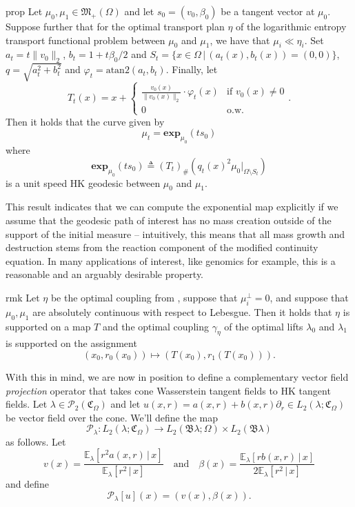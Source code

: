 \documentclass[11pt]{article}
\begin{document}
\begin{restatable}{prop}{} \label{HK exponential map closed form}
    Let $\mu_0, \mu_1 \in \mathfrak{M}_+(\Omega)$ and let $s_0 = (v_0, \beta_0)$ be a tangent vector at $\mu_0$. Suppose further that for the optimal transport plan $\eta$ of the logarithmic entropy transport functional problem between $\mu_0$ and $\mu_1$, we have that $\mu_i \ll \eta_i$. Set $a_t = t\|v_0\|_2$, $b_t = 1 + t\beta_0/2$ and $S_t = \{x \in \Omega \, | \, (a_t(x), b_t(x)) = (0, 0) \}$, $q = \sqrt{a_t^2 + b_t^2}$ and $\varphi_t = \text{atan2}(a_t, b_t).$ Finally, let 
    \[T_t ( x) = x + \begin{cases}
        \frac{v_0(x)}{\|v_0(x)\|_2}\cdot \varphi_t(x) & \text{if } v_0(x) \neq 0 \\
        0 & \text{o.w.}
    \end{cases}.\]
    Then it holds that the curve given by 
    \begin{equation*}
        \mu_t = \mathbf{exp}_{\mu_0}(ts_0)
    \end{equation*}
    where 
    \[\mathbf{exp}_{\mu_0}(ts_0) \triangleq (T_t)_\#(q_t(x)^2 \mu_0|_{\Omega \setminus S_t})\]
    is a unit speed HK geodesic between $\mu_0$ and $\mu_1$.  
\end{restatable}
This result indicates that we can compute the exponential map explicitly if we assume that the geodesic path of interest has no mass creation outside of the support of the initial measure -- intuitively, this means that all mass growth and destruction stems from the reaction component of the modified continuity equation. In many applications of interest, like genomics for example, this is a reasonable and an arguably desirable property. 
\begin{restatable}{rmk}{} \label{clancy coupling supported on a map}
    Let $\eta$ be the optimal coupling from , suppose that $\mu_i^\perp = 0$, and suppose that $\mu_0, \mu_1$ are absolutely continuous with respect to Lebesgue. Then it holds that $\eta$ is supported on a map $T$ and the optimal coupling $\gamma_\eta$ of the optimal lifts $\lambda_0$ and $\lambda_1$ is supported on the assignment
    \[(x_0, r_0(x_0)) \mapsto (T(x_0), r_1(T(x_0))). \]
\end{restatable} 
\noindent With this in mind, we are now in position to define a complementary vector field \textit{projection} operator that takes cone Wasserstein tangent fields to HK tangent fields. Let $\lambda \in \mathcal{P}_2(\mathfrak{C}_\Omega)$ and let $u(x,r) = a(x,r) + b(x,r)\partial_r \in L_2(\lambda; \mathfrak{C}_\Omega)$ be vector field over the cone. We'll define the map  
\[\mathcal{P}_{\lambda}: L_2(\lambda; \mathfrak{C}_\Omega) \rightarrow L_2(\mathfrak{B}\lambda; \Omega) \times L_2(\mathfrak{B}\lambda) \]
as follows. Let 
\[v(x) = \frac{\mathbb{E}_\lambda[r^2a(x,r) \,|\, x]}{\mathbb{E}_\lambda[r^2 \,| \,x]} \quad \text{and} \quad \beta(x) = \frac{\mathbb{E}_\lambda[rb(x,r) \, | \, x]}{2\mathbb{E}_\lambda[r^2 \, | \, x]}\]
and define
\[\mathcal{P}_\lambda[u](x) = (v(x), \beta(x)).\]
\end{document}
